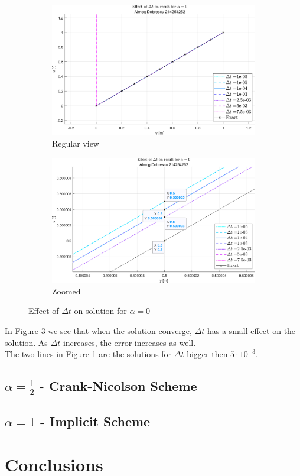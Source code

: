 \documentclass[11pt, a4paper]{article}
\begin{document}
\begin{figure}[H]
    \centering
    \begin{subfigure}[b]{.49\textwidth}
        \centering
        \includegraphics[width=\textwidth]{images/grap2.1.png}
        \caption{Regular view}
        \label{fig2A}
    \end{subfigure}
    \hfill
    \begin{subfigure}[b]{.49\textwidth}
        \centering
        \includegraphics[width=\textwidth]{images/grap2.2.png}
        \caption{Zoomed}
        \label{fig2B}
    \end{subfigure}
    \caption{Effect of $\Delta t$ on solution for $\alpha =0$}
    \label{fig2}
\end{figure}
\noindent In Figure \ref{fig2} we see that when the solution converge, $\Delta t$ has a small effect on the solution. As $\Delta t$ increases, the error increases as well.\\
\noindent The two lines in Figure \ref{fig2A} are the solutions for $\Delta t$ bigger then $5\cdot10^{-3}.$

\newpage
\subsection{$\alpha = \frac{1}{2}$ - Crank-Nicolson Scheme}


\subsection{$\alpha = 1$ - Implicit Scheme}

\newpage

\section{Conclusions}
\newpage
\end{document}
